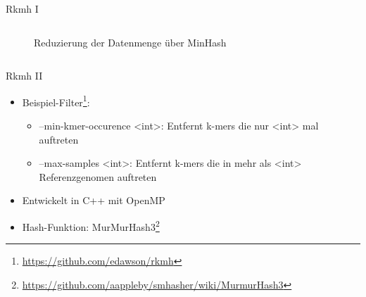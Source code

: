 \begin{frame}{Rkmh I}
\begin{columns}
\begin{column}{.40\textwidth}
\begin{figure}[H]
                \caption{Reduzierung der Datenmenge über MinHash \cite{mashSimilarityImage}}
            \end{figure}
        \end{column}
    \end{columns}
\end{frame}


\begin{frame}{Rkmh II}
    \begin{itemize}
        \item Beispiel-Filter\footnote{\url{https://github.com/edawson/rkmh}}: 
        \begin{itemize}
            \item --min-kmer-occurence <int>: Entfernt k-mers die nur <int> mal auftreten
            \item --max-samples <int>: Entfernt k-mers die in mehr als <int> Referenzgenomen auftreten
        \end{itemize} \pause
        \item Entwickelt in C++ mit OpenMP \pause
        \item Hash-Funktion: MurMurHash3\footnote{\url{https://github.com/aappleby/smhasher/wiki/MurmurHash3}}
    \end{itemize}
\end{frame}

